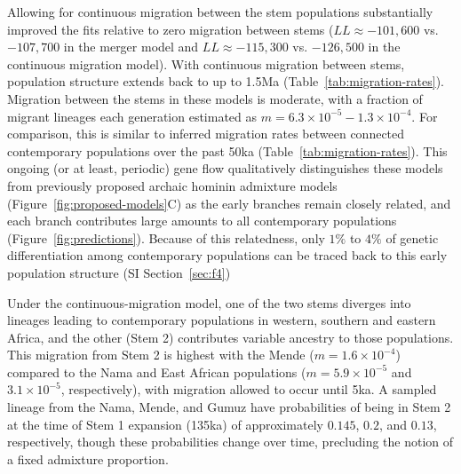 \documentclass[]{article}
\begin{document}
Allowing for continuous migration between the stem populations substantially
improved the fits relative to zero migration between stems ($LL \approx
-101,600$ vs. $-107,700$ in the merger model and $LL \approx -115,300$ vs.
$-126,500$ in the continuous migration model).  With continuous migration
between stems, population structure extends back to up to 1.5Ma
(Table~\ref{tab:migration-rates}).  Migration between the stems in these models
is moderate, with a fraction of migrant lineages each generation estimated as
$m=6.3\times10^{-5}-1.3\times10^{-4}$. For comparison, this is similar to
inferred migration rates between connected contemporary populations over the
past 50ka (Table~\ref{tab:migration-rates}). This ongoing (or at least,
periodic) gene flow qualitatively distinguishes these models from previously
proposed archaic hominin admixture models (Figure~\ref{fig:proposed-models}C)
as the early branches remain closely related, and each branch contributes large
amounts to all contemporary populations (Figure~\ref{fig:predictions}).
Because of this relatedness, only $1\%$ to $4\%$ of genetic differentiation
among contemporary populations can be traced back to this early population
structure (SI Section~\ref{sec:f4})
 
Under the continuous-migration model, one of the two stems diverges into
lineages leading to contemporary populations in western, southern and eastern
Africa, and the other (Stem 2) contributes variable ancestry to those
populations. This migration from Stem 2 is highest with the Mende
($m=1.6\times10^{-4}$) compared to the Nama and East African populations
($m=5.9\times10^{-5}$ and $3.1\times10^{-5}$, respectively), with migration
allowed to occur until 5ka. A sampled lineage from the Nama, Mende, and Gumuz
have probabilities of being in Stem 2 at the time of Stem 1 expansion (135ka)
of approximately $0.145$, $0.2$, and $0.13$, respectively, though these
probabilities change over time, precluding the notion of a fixed admixture
proportion.
\end{document}
